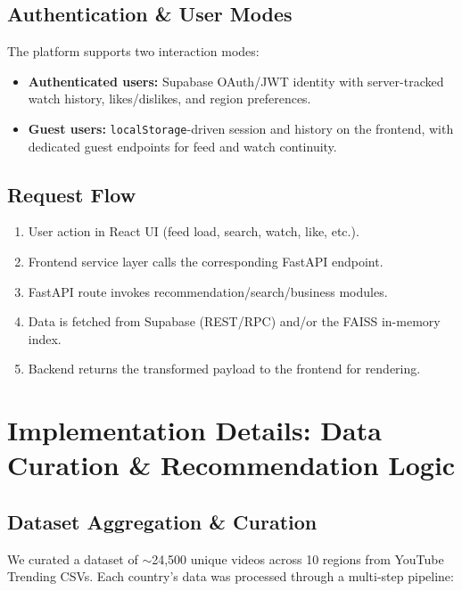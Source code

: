 \documentclass[11pt, a4paper]{report}
\begin{document}
\subsection{Authentication \& User Modes}
The platform supports two interaction modes:
\begin{itemize}
    \item \textbf{Authenticated users:} Supabase OAuth/JWT identity with server-tracked watch history, likes/dislikes, and region preferences.
    \item \textbf{Guest users:} \texttt{localStorage}-driven session and history on the frontend, with dedicated guest endpoints for feed and watch continuity.
\end{itemize}

\subsection{Request Flow}
\begin{enumerate}
    \item User action in React UI (feed load, search, watch, like, etc.).
    \item Frontend service layer calls the corresponding FastAPI endpoint.
    \item FastAPI route invokes recommendation/search/business modules.
    \item Data is fetched from Supabase (REST/RPC) and/or the FAISS in-memory index.
    \item Backend returns the transformed payload to the frontend for rendering.
\end{enumerate}

\section{Implementation Details: Data Curation \& Recommendation Logic}

\subsection{Dataset Aggregation \& Curation}
We curated a dataset of $\sim$24,500 unique videos across 10 regions from YouTube Trending CSVs. Each country's data was processed through a multi-step pipeline:
\end{document}
